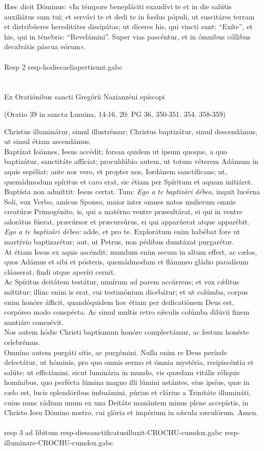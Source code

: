 \documentclass[options]{article}
\begin{document}
	Hæc dicit Dóminus: «In témpore benepláciti exaudívi te et in die salútis auxiliátus sum tui; et servávi te et dedi te in fœdus pópuli, ut suscitáres terram et distribúeres hereditátes dissipátas; ut díceres his, qui vincti sunt: “Exíte”, et his, qui in ténebris: “Revelámini”. Super vias pascéntur, et in ómnibus cóllibus decalvátis páscua eórum».\\
	\\
	Resp 2 resp-hodiecaeliapertisunt.gabc\\
	\\\\
	Ex Oratiónibus sancti Gregórii Nazianzéni epíscopi\\
	\begin{flushright}
		(Oratio 39 in sancta Lumina, 14-16. 20: PG 36, 350-351. 354. 358-359)
	\end{flushright} 
	Christus illuminátur, simul illustrémur; Christus baptizátur, simul descendámus, ut simul étiam ascendámus.\\
	Baptízat Ioánnes, Iesus accédit; forsan quidem ut ipsum quoque, a quo baptizátur, sanctitáte affíciat; proculdúbio autem, ut totum véterem Adámum in aquis sepéliat: ante nos vero, et propter nos, Iordánem sanctíficans; ut, quemádmodum spíritus et caro erat, sic étiam per Spíritum et aquam initiáret.\\
	Baptísta non admíttit: Iesus certat. Tum: \emph{Ego a te baptizári débeo,} inquit lucérna Soli, vox Verbo, amícus Sponso, maior inter omnes natos mulíerum omnis creatúræ Primogénito, is, qui a matérno ventre præsultárat, ei qui in ventre adorátus fúerat, præcúrsor et præcursúrus, ei qui apparúerat atque apparébit. \emph{Ego a te baptizári débeo:} adde, et pro te. Explorátum enim habébat fore ut martýrio baptizarétur; aut, ut Petrus, non pédibus dumtáxat purgarétur.\\
	At étiam Iesus ex aquis ascéndit; mundum enim secum in altum effert, ac cælos, quos Adámus et sibi et pósteris, quemádmodum et flámmeo gládio paradísum cláuserat, findi atque aperíri cernit.\\
	Ac Spíritus deitátem testátur, nimírum ad parem accúrrens; et vox c\'{æ}litus míttitur; illinc enim is erat, cui testimónium dicebátur; et ut colúmba, corpus enim honóre áfficit, quandóquidem hoc étiam per deificatiónem Deus est, corpóreo modo conspécta. Ac simul multis retro s\'{æ}culis colúmba dilúvii finem nuntiáre consuévit.\\
	Nos autem hódie Christi baptísmum honóre complectámur, ac festum honéste celebrémus.\\
	Omníno autem purgáti sitis, ac purgémini. Nulla enim re Deus perínde delectátur, ut hóminis, pro quo omnis sermo et ómnia mystéria, resipiscéntia et salúte; ut efficiámini, sicut luminária in mundo, vis quædam vitális réliquis homínibus, quo perfécta lúmina magno illi lúmini astántes, eius ipsíus, quæ in cælo est, lucis splendóribus imbuámini, púrius et clárius a Trinitáte illumináti, cuius nunc rádium unum ex una Deitáte manántem minus plene accepístis, in Christo Iesu Dómino nostro, cui glória et impérium in s\'{æ}cula sæculórum. Amen.\\
	\\
	resp 3 ad libitum
	resp-diessanctificatusilluxit-CROCHU-cumdox.gabc
	resp-illuminare-CROCHU-cumdox.gabc
	
\end{document}
